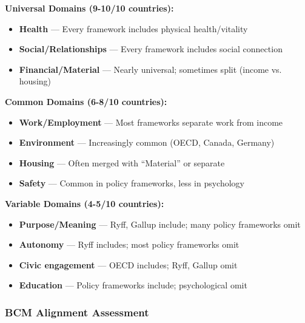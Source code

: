 \begin{tcolorbox}[colback=green!5!white, colframe=green!75!black, title=Empirical Convergence: What WEIRD Countries Agree On]

\textbf{Universal Domains (9-10/10 countries):}
\begin{itemize}[nosep]
\item \textbf{Health} --- Every framework includes physical health/vitality
\item \textbf{Social/Relationships} --- Every framework includes social connection
\item \textbf{Financial/Material} --- Nearly universal; sometimes split (income vs. housing)
\end{itemize}

\textbf{Common Domains (6-8/10 countries):}
\begin{itemize}[nosep]
\item \textbf{Work/Employment} --- Most frameworks separate work from income
\item \textbf{Environment} --- Increasingly common (OECD, Canada, Germany)
\item \textbf{Housing} --- Often merged with ``Material'' or separate
\item \textbf{Safety} --- Common in policy frameworks, less in psychology
\end{itemize}

\textbf{Variable Domains (4-5/10 countries):}
\begin{itemize}[nosep]
\item \textbf{Purpose/Meaning} --- Ryff, Gallup include; many policy frameworks omit
\item \textbf{Autonomy} --- Ryff includes; most policy frameworks omit
\item \textbf{Civic engagement} --- OECD includes; Ryff, Gallup omit
\item \textbf{Education} --- Policy frameworks include; psychological omit
\end{itemize}

\end{tcolorbox}

\subsubsection{BCM Alignment Assessment}

